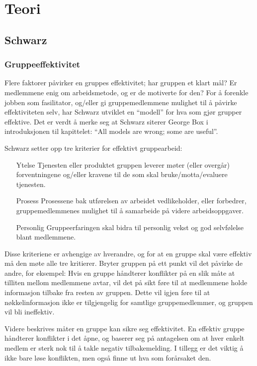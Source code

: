 \chapter{Teori}
\section{Schwarz}
\subsection{Gruppeeffektivitet}


Flere faktorer påvirker en gruppes effektivitet; har gruppen et klart mål? Er
medlemmene enig om arbeidsmetode, og er de motiverte for den? For å forenkle
jobben som fasilitator, og/eller gi gruppemedlemmene mulighet til å påvirke
effektiviteten selv, har Schwarz utviklet en ``modell'' for hva som gjør grupper
effektive. Det er verdt å merke seg at Schwarz siterer George Box i
introduksjonen til kapittelet: ``All models are wrong; some are useful''.

Schwarz setter opp tre kriterier for effektivt gruppearbeid:

\begin{itemize}
\item[Ytelse] Tjenesten eller produktet gruppen leverer møter (eller overgår)
	forventningene og/eller kravene til de som skal bruke/motta/evaluere
	tjenesten.
\item[Prosess] Prosessene bak utførelsen av arbeidet vedlikeholder, eller
forbedrer, gruppemedlemmenes mulighet til å samarbeide på videre
arbeidsoppgaver.
\item[Personlig] Gruppeerfaringen skal bidra til personlig vekst og god
selvfølelse blant medlemmene.
\end{itemize}

Disse kriteriene er avhengige av hverandre, og for at en gruppe skal være
effektiv må den møte alle tre kritierer. Bryter gruppen på ett punkt vil det
påvirke de andre, for eksempel: Hvis en gruppe håndterer konflikter på en slik
måte at tilliten mellom medlemmene avtar, vil det på sikt føre til at medlemmene
holde informasjon tilbake fra resten av gruppen. Dette vil igjen føre til at
nøkkelinformasjon ikke er tilgjengelig for samtlige gruppemedlemmer, og gruppen
vil bli ineffektiv.

Videre beskrives måter en gruppe kan sikre seg effektivitet. En effektiv gruppe
håndterer konflikter i det åpne, og baserer seg på antagelsen om at hver enkelt
medlem er sterk nok til å takle negativ tilbakemelding. I tillegg er det viktig
å ikke bare løse konflikten, men også finne ut hva som forårsaket den. 

